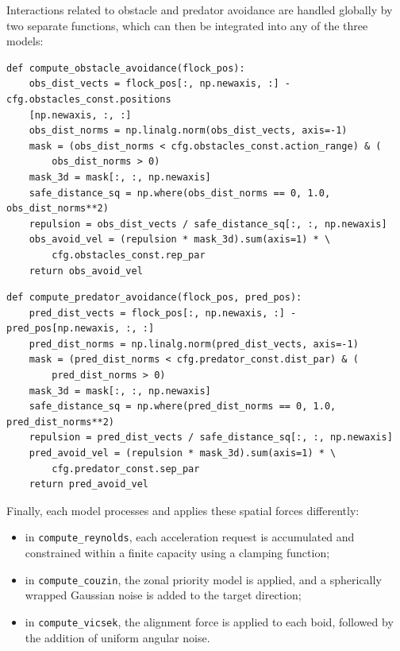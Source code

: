 Interactions related to obstacle and predator avoidance are handled globally by two separate functions, which can then be integrated into any of the three models:

\begin{verbatim}
def compute_obstacle_avoidance(flock_pos):
    obs_dist_vects = flock_pos[:, np.newaxis, :] -  cfg.obstacles_const.positions
    [np.newaxis, :, :]
    obs_dist_norms = np.linalg.norm(obs_dist_vects, axis=-1)
    mask = (obs_dist_norms < cfg.obstacles_const.action_range) & (
        obs_dist_norms > 0)
    mask_3d = mask[:, :, np.newaxis]
    safe_distance_sq = np.where(obs_dist_norms == 0, 1.0, obs_dist_norms**2)
    repulsion = obs_dist_vects / safe_distance_sq[:, :, np.newaxis]
    obs_avoid_vel = (repulsion * mask_3d).sum(axis=1) * \
        cfg.obstacles_const.rep_par
    return obs_avoid_vel
\end{verbatim}

\begin{verbatim}
def compute_predator_avoidance(flock_pos, pred_pos):
    pred_dist_vects = flock_pos[:, np.newaxis, :] - pred_pos[np.newaxis, :, :]
    pred_dist_norms = np.linalg.norm(pred_dist_vects, axis=-1)
    mask = (pred_dist_norms < cfg.predator_const.dist_par) & (
        pred_dist_norms > 0)
    mask_3d = mask[:, :, np.newaxis]
    safe_distance_sq = np.where(pred_dist_norms == 0, 1.0, pred_dist_norms**2)
    repulsion = pred_dist_vects / safe_distance_sq[:, :, np.newaxis]
    pred_avoid_vel = (repulsion * mask_3d).sum(axis=1) * \
        cfg.predator_const.sep_par
    return pred_avoid_vel
\end{verbatim}

Finally, each model processes and applies these spatial forces differently:

\begin{itemize}
    \item in \texttt{compute\_reynolds}, each acceleration request is accumulated and constrained within a finite capacity using a clamping function;
    \item in \texttt{compute\_couzin}, the zonal priority model is applied, and a spherically wrapped Gaussian noise is added to the target direction;
    \item in \texttt{compute\_vicsek}, the alignment force is applied to each boid, followed by the addition of uniform angular noise.
\end{itemize}

